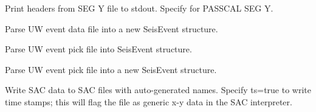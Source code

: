\documentclass[letterpaper,11pt,english]{sphinxmanual}
\begin{document}
Print headers from SEG Y file to stdout. Specify  for PASSCAL SEG Y.

\begin{fulllineitems}
\label{\detokenize{src/Formats/fileformats:uwdf}}
\end{fulllineitems}


Parse UW event data file  into a new SeisEvent structure.


\begin{fulllineitems}
\end{fulllineitems}


Parse UW event pick file into SeisEvent structure.

\begin{fulllineitems}
\label{\detokenize{src/Formats/fileformats:uwpf}}
\end{fulllineitems}


Parse UW event pick file  into a new SeisEvent structure.

\begin{fulllineitems}
\label{\detokenize{src/Formats/fileformats:writesac}}
\end{fulllineitems}


\begin{fulllineitems}
\label{\detokenize{src/Formats/fileformats:wsac}}
\end{fulllineitems}


Write SAC data to SAC files with auto-generated names. Specify ts=true to write time stamps; this will flag the file as generic x-y data in the SAC interpreter.
\end{document}
